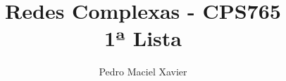 \documentclass{homework}
\title{Redes Complexas - CPS765 \\[1ex]%
	1ª Lista}
\author{Pedro Maciel Xavier}
\begin{document}
	
	\quest
	
\end{document}

